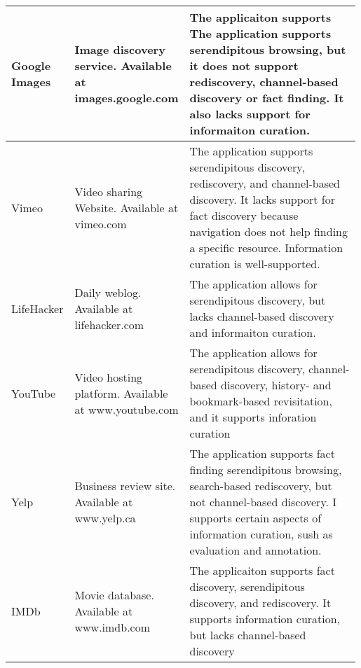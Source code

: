 \documentclass{casconpaper}
\begin{document}
{\begin{table*}[htbp]
\begin{tabular}{|p{0.11\linewidth}| p{0.22\linewidth}| p{0.66\linewidth}|}
\hline
Google Images   & Image discovery service. Available at images.google.com                      & The applicaiton supports The application supports serendipitous browsing, but it does not support rediscovery, channel-based discovery or fact finding. It also lacks support for informaiton curation.                                                                                                         \\
\hline
Vimeo           & Video sharing Website. Available at vimeo.com                                & The application supports serendipitous discovery, rediscovery, and channel-based discovery. It lacks support for fact discovery because navigation does not help finding a specific resource. Information curation is well-supported.                                                                           \\
\hline
LifeHacker      & Daily weblog. Available at lifehacker.com                                    & The application allows for serendipitous discovery, but lacks channel-based discovery and informaiton curation.                                                                                                                                                                                                 \\
\hline
YouTube         & Video hosting platform. Available at www.youtube.com                         & The application allows for serendipitous discovery, channel-based discovery, history- and bookmark-based revisitation, and it supports inforation curation                                                                                                                                                      \\
\hline
Yelp            & Business review site. Available at www.yelp.ca                               & The application supports fact finding serendipitous browsing, search-based rediscovery, but not channel-based discovery. I supports certain aspects of information curation, sush as evaluation and annotation.                                                                                                 \\
\hline
IMDb            & Movie database. Available at www.imdb.com                                    & The applicaiton supports fact discovery, serendipitous discovery, and rediscovery. It supports information curation, but lacks channel-based discovery                                                                                                                                                          \\

\end{tabular}
\end{table*}}
\end{document}
